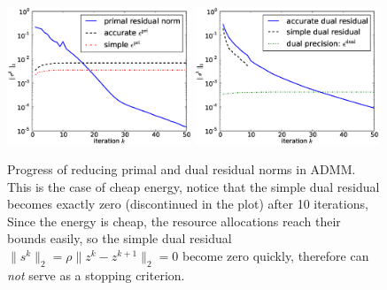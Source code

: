 \begin{figure}[th]
\centering
\includegraphics[width=0.49\textwidth]{figures/test_primal_c.eps}
\includegraphics[width=0.49\textwidth]{figures/test_dual_c.eps}
\caption{Progress of reducing primal and dual residual norms in ADMM.
    This is the case of cheap energy, notice that the simple dual
residual becomes exactly zero (discontinued in the plot) after 10 iterations, 
Since the energy is cheap, the resource allocations reach their bounds easily,
so the simple dual residual $\|s^k\|_2=\rho\|z^{k}-z^{k+1}\|_2=0$ 
become zero quickly, therefore can \emph{not} serve as a stopping criterion.}
\label{fig:residual-c}
\end{figure}

